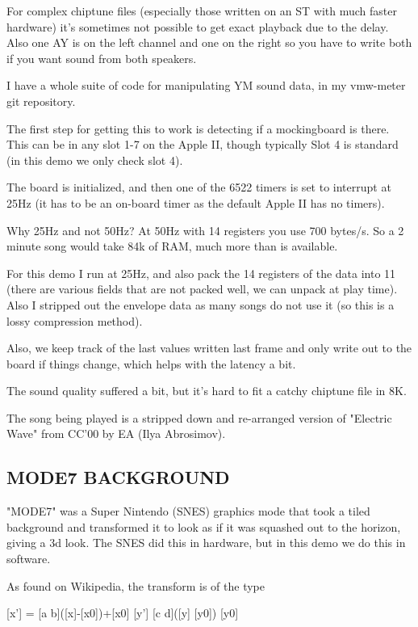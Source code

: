 \documentclass[twocolumn]{article}
\begin{document}
   For complex chiptune files (especially those written on an ST with much
   faster hardware) it's sometimes not possible to get exact playback
   due to the delay.  Also one AY is on the left channel and one on the right
   so you have to write both if you want sound from both speakers.

   I have a whole suite of code for manipulating YM sound data, in my
   vmw-meter git repository.

   The first step for getting this to work is detecting if a mockingboard is
   there.  This can be in any slot 1-7 on the Apple II, though typically
   Slot 4 is standard (in this demo we only check slot 4).

   The board is initialized, and then one of the 6522 timers is set to
   interrupt at 25Hz (it has to be an on-board timer as the default
   Apple II has no timers).

   Why 25Hz and not 50Hz?  At 50Hz with 14 registers you use 700 bytes/s.
   So a 2 minute song would take 84k of RAM, much more than is available.

   For this demo I run at 25Hz, and also pack the 14 registers of the data
   into 11 (there are various fields that are not packed well, we can
   unpack at play time).  Also I stripped out the envelope data as many
   songs do not use it (so this is a lossy compression method).

   Also, we keep track of the last values written last frame and only
   write out to the board if things change, which helps with the latency
   a bit.

   The sound quality suffered a bit, but it's hard to fit a catchy chiptune
   file in 8K.

   The song being played is a stripped down and re-arranged version of
   "Electric Wave" from CC'00 by EA (Ilya Abrosimov). 


\subsection{MODE7 BACKGROUND}

  "MODE7" was a Super Nintendo (SNES) graphics mode that took a tiled
  background and transformed it to look as if it was squashed out to
  the horizon, giving a 3d look.  The SNES did this in hardware, but
  in this demo we do this in software.

  As found on Wikipedia, the transform is of the type

  [x'] = [a b]([x]-[x0])+[x0]
  [y']   [c d]([y] [y0]) [y0]
  
\end{document}
